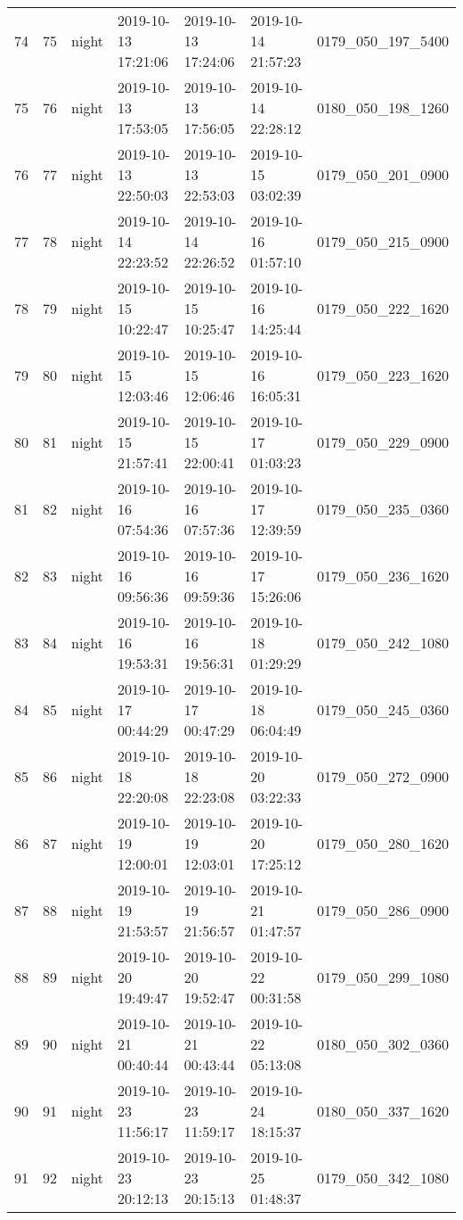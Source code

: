 \begin{longtable}{lrlllll}
74 & 75 & night & 2019-10-13 17:21:06 & 2019-10-13 17:24:06 & 2019-10-14 21:57:23 & 0179_050_197_5400 \\
75 & 76 & night & 2019-10-13 17:53:05 & 2019-10-13 17:56:05 & 2019-10-14 22:28:12 & 0180_050_198_1260 \\
76 & 77 & night & 2019-10-13 22:50:03 & 2019-10-13 22:53:03 & 2019-10-15 03:02:39 & 0179_050_201_0900 \\
77 & 78 & night & 2019-10-14 22:23:52 & 2019-10-14 22:26:52 & 2019-10-16 01:57:10 & 0179_050_215_0900 \\
78 & 79 & night & 2019-10-15 10:22:47 & 2019-10-15 10:25:47 & 2019-10-16 14:25:44 & 0179_050_222_1620 \\
79 & 80 & night & 2019-10-15 12:03:46 & 2019-10-15 12:06:46 & 2019-10-16 16:05:31 & 0179_050_223_1620 \\
80 & 81 & night & 2019-10-15 21:57:41 & 2019-10-15 22:00:41 & 2019-10-17 01:03:23 & 0179_050_229_0900 \\
81 & 82 & night & 2019-10-16 07:54:36 & 2019-10-16 07:57:36 & 2019-10-17 12:39:59 & 0179_050_235_0360 \\
82 & 83 & night & 2019-10-16 09:56:36 & 2019-10-16 09:59:36 & 2019-10-17 15:26:06 & 0179_050_236_1620 \\
83 & 84 & night & 2019-10-16 19:53:31 & 2019-10-16 19:56:31 & 2019-10-18 01:29:29 & 0179_050_242_1080 \\
84 & 85 & night & 2019-10-17 00:44:29 & 2019-10-17 00:47:29 & 2019-10-18 06:04:49 & 0179_050_245_0360 \\
85 & 86 & night & 2019-10-18 22:20:08 & 2019-10-18 22:23:08 & 2019-10-20 03:22:33 & 0179_050_272_0900 \\
86 & 87 & night & 2019-10-19 12:00:01 & 2019-10-19 12:03:01 & 2019-10-20 17:25:12 & 0179_050_280_1620 \\
87 & 88 & night & 2019-10-19 21:53:57 & 2019-10-19 21:56:57 & 2019-10-21 01:47:57 & 0179_050_286_0900 \\
88 & 89 & night & 2019-10-20 19:49:47 & 2019-10-20 19:52:47 & 2019-10-22 00:31:58 & 0179_050_299_1080 \\
89 & 90 & night & 2019-10-21 00:40:44 & 2019-10-21 00:43:44 & 2019-10-22 05:13:08 & 0180_050_302_0360 \\
90 & 91 & night & 2019-10-23 11:56:17 & 2019-10-23 11:59:17 & 2019-10-24 18:15:37 & 0180_050_337_1620 \\
91 & 92 & night & 2019-10-23 20:12:13 & 2019-10-23 20:15:13 & 2019-10-25 01:48:37 & 0179_050_342_1080 \\

\end{longtable}
